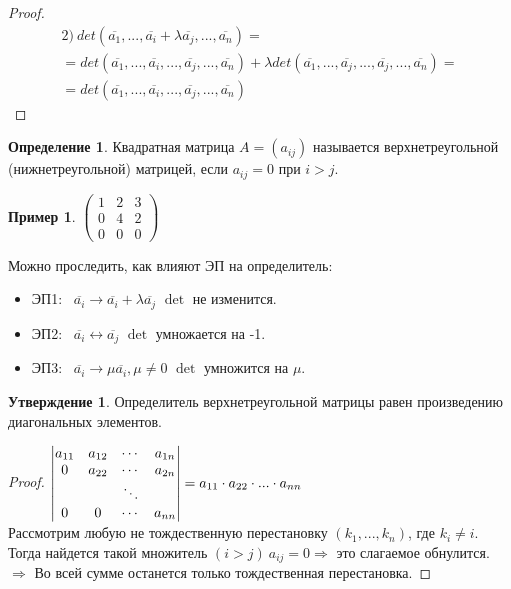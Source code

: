 \documentclass[a4paper, 12pt]{article}
\newcommand\tab[1][.5cm]{\hspace*{#1}}
\theoremstyle{definition}
\newtheorem*{definition}{Определение}
\newtheorem*{subtheorem}{Утверждение}
\newtheorem*{example1}{Пример}
\begin{document}
  \begin{proof} \tab
    \begin{multline*}
      2) \ det(\overline{a_1},...,\overline{a_i}+\lambda \overline{a_j},...,\overline{a_n}) = \\ = det(\overline{a_1},...,\overline{a_i},...,\overline{a_j},...,\overline{a_n}) + \lambda det(\overline{a_1},...,\overline{a_j},...,\overline{a_j},...,\overline{a_n}) = \\ = det(\overline{a_1},...,\overline{a_i},...,\overline{a_j},...,\overline{a_n})
    \end{multline*}
  \end{proof} 
  \begin{definition}
    Квадратная матрица $A = (a_{ij})$ называется верхнетреугольной (нижнетреугольной) матрицей, если $a_{ij} = 0$ при $i>j$. 
    \begin{example1}
      $\begin{pmatrix}
        1 & 2 & 3 \\ 0 & 4 & 2 \\ 0 & 0& 0
      \end{pmatrix}$
    \end{example1}  
  \end{definition} 
  Можно проследить, как влияют ЭП на определитель:
  \begin{itemize}
    \item ЭП1: \ $\overline{a_i} \to \overline{a_i} + \lambda \overline{a_j}$ \tab[0.87cm] $\det$ не изменится. 
    \item ЭП2: \ $\overline{a_i} \leftrightarrow  \overline{a_j}$ \tab[2.15cm] $\det$ умножается на -1. 
    \item ЭП3: \ $\overline{a_i} \to \mu \overline{a_i}, \mu \not = 0$ \tab[0.45cm] $\det$ умножится на $\mu$. 
  \end{itemize}
  \begin{subtheorem}
    Определитель верхнетреугольной матрицы равен произведению диагональных элементов.
  \end{subtheorem} 
  \begin{proof}
    $\begin{vmatrix}
      a_{11} & a_{12} & \cdots & a_{1n} \\
      0 & a_{22} & \cdots & a_{2n} \\
      \null & \null & \ddots & \null \\
      0 & 0 & \cdots & a_{nn} 
    \end{vmatrix} = a_{11}\cdot a_{22}\cdot...\cdot a_{nn}$ \vspace{0.5cm}\\
    Рассмотрим любую не тождественную перестановку $(k_1,...,k_n)$, где $k_i \not = i$. Тогда найдется такой множитель $(i>j) \ a_{ij} = 0  \Longrightarrow $ это слагаемое обнулится. $\Longrightarrow $ Во всей сумме останется только тождественная перестановка. 
  \end{proof} 
\end{document}
